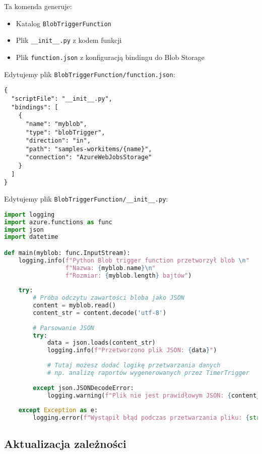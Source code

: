 \documentclass{article}
\begin{document}
Ta komenda generuje:
\begin{itemize}
    \item Katalog \texttt{BlobTriggerFunction}
    \item Plik \texttt{\_\_init\_\_.py} z kodem funkcji
    \item Plik \texttt{function.json} z konfiguracją bindingu do Blob Storage
\end{itemize}

Edytujemy plik \texttt{BlobTriggerFunction/function.json}:

\begin{lstlisting}[]
{
  "scriptFile": "__init__.py",
  "bindings": [
    {
      "name": "myblob",
      "type": "blobTrigger",
      "direction": "in",
      "path": "samples-workitems/{name}",
      "connection": "AzureWebJobsStorage"
    }
  ]
}
\end{lstlisting}

Edytujemy plik \texttt{BlobTriggerFunction/\_\_init\_\_.py}:

\begin{lstlisting}[language=Python]
import logging
import azure.functions as func
import json
import datetime

def main(myblob: func.InputStream):
    logging.info(f"Python Blob trigger function przetworzył blob \n"
                 f"Nazwa: {myblob.name}\n"
                 f"Rozmiar: {myblob.length} bajtów")
    
    try:
        # Próba odczytu zawartości bloba jako JSON
        content = myblob.read()
        content_str = content.decode('utf-8')
        
        # Parsowanie JSON
        try:
            data = json.loads(content_str)
            logging.info(f"Przetworzono plik JSON: {data}")
            
            # Tutaj możesz dodać logikę przetwarzania danych
            # np. analizę raportów wygenerowanych przez TimerTrigger
            
        except json.JSONDecodeError:
            logging.warning(f"Plik nie jest prawidłowym JSON: {content_str[:100]}...")
            
    except Exception as e:
        logging.error(f"Wystąpił błąd podczas przetwarzania pliku: {str(e)}")
\end{lstlisting}

\subsection{Aktualizacja zależności}
\end{document}
